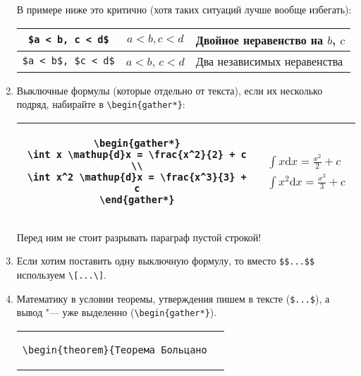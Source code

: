 \documentclass[12pt,a4paper]{book}
\def\d{\mathup{d}}
\renewcommand{\thesection}{\arabic{section}}
\newcounter{theorem}[section]
\renewcommand{\thetheorem}{\thesection.\arabic{theorem}}
\newcommand*{\theoremheader}[1]{\par\refstepcounter{theorem}%
\textbf{Теорема \thetheorem.\ifthenelse{\equal{#1}{}}{}{ #1.}}}
\newenvironment*{theorem}[1]{%
\theoremheader{#1}%
}{%
\par%
}
\begin{document}
\begin{enumerate}
В примере ниже это критично (хотя таких ситуаций лучше вообще избегать):
	
\begin{center}\begin{tabular}{|c|c|l|}
\hline \verb!$a < b, c < d$! & $a < b, c < d$ & Двойное неравенство на $b$, $c$ \\
\hline \verb!$a < b$, $c < d$! & $a < b$, $c < d$ & Два независимых неравенства \\
\hline
\end{tabular}\end{center}

\item Выключные формулы (которые отдельно от текста), если их несколько подряд, набирайте в \verb'\begin{gather*}':
\begin{center}\begin{tabular}{|c|c|}
\hline
\begin{minipage}{8cm}
\begin{verbatim}
\begin{gather*}
\int x \d x = \frac{x^2}{2} + c \\
\int x^2 \d x = \frac{x^3}{3} + c
\end{gather*}
\end{verbatim}
\end{minipage}
&
\begin{minipage}{8cm}
\begin{gather*}
\int x \d x = \frac{x^2}{2} + c \\
\int x^2 \d x = \frac{x^3}{3} + c
\end{gather*}
\end{minipage} \\
\hline
\end{tabular}\end{center}
Перед ним не стоит разрывать параграф пустой строкой!
\item Если хотим поставить одну выключную формулу, то вместо \verb!$$...$$! используем \verb!\[...\]!.
\item Математику в условии теоремы, утверждения пишем в тексте (\verb'$...$'), а вывод "--- уже выделенно (\verb'\begin{gather*}').
\begin{center}\begin{tabular}{|c|c|}
\hline
\begin{minipage}{8.6cm}
\begin{verbatim}
\begin{theorem}{Теорема Больцано

\end{verbatim}
\end{minipage}
\end{tabular}
\end{center}
\end{enumerate}
\end{document}
